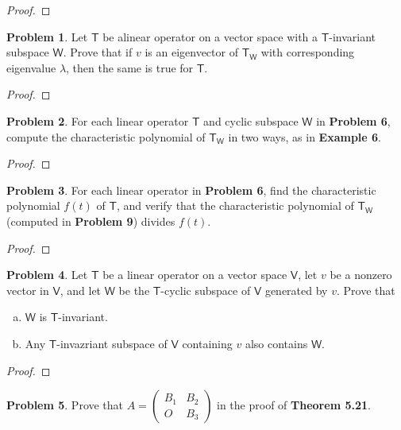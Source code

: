 \documentclass[12pt]{book}
\theoremstyle{definition}
\newtheorem{problem}{Problem}
\begin{document}
	\begin{proof}
	\end{proof}
	\newpage
	\begin{problem}
		Let $\mathsf{T}$ be alinear operator on a vector space with a $\mathsf{T}$-invariant subspace $\mathsf{W}$. Prove that if $v$ is an eigenvector of $\mathsf{T}_\mathsf{W}$ with corresponding eigenvalue $\lambda$, then the same is true for $\mathsf{T}$.
	\end{problem}
	\begin{proof}
	\end{proof}
	\newpage
	\begin{problem}
		For each linear operator $\mathsf{T}$ and cyclic subspace $\mathsf{W}$ in \textbf{Problem 6}, compute the characteristic polynomial of $\mathsf{T}_\mathsf{W}$ in two ways, as in \textbf{Example 6}.
	\end{problem}
	\begin{proof}
	\end{proof}
	\newpage	
	\begin{problem}
		For each linear operator in \textbf{Problem 6}, find the characteristic polynomial $f(t)$ of $\mathsf{T}$, and verify that the characteristic polynomial of $\mathsf{T}_\mathsf{W}$ (computed in \textbf{Problem 9}) divides $f(t)$.
	\end{problem}
	\begin{proof}
	\end{proof}
	\newpage
	\begin{problem}
		Let $\mathsf{T}$ be a linear operator on a vector space $\mathsf{V}$, let $v$ be a nonzero vector in $\mathsf{V}$, and let $\mathsf{W}$ be the $\mathsf{T}$-cyclic subspace of $\mathsf{V}$ generated by $v$. Prove that
		\begin{enumerate}[(a)]
			\item $\mathsf{W}$ is $\mathsf{T}$-invariant.
			\item Any $\mathsf{T}$-invazriant subspace of $\mathsf{V}$ containing $v$ also contains $\mathsf{W}$.
		\end{enumerate}
	\end{problem}
	\begin{proof}
	\end{proof}
	\newpage
	\begin{problem}
		Prove that $A=\begin{pmatrix}
			B_1&B_2\\O&B_3
		\end{pmatrix}$ in the proof of \textbf{Theorem 5.21}.
	\end{problem}
\end{document}
